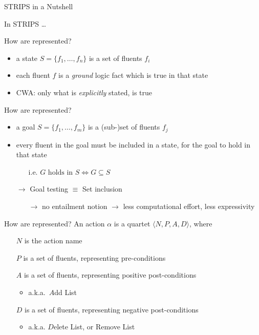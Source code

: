 \documentclass[presentation]{beamer}\mode<presentation>{\usetheme{AMSBolognaFC}}
\begin{document}
\begin{frame}[allowframebreaks]{STRIPS in a Nutshell}

In STRIPS \ldots

\begin{block}{How are  represented?}
    \begin{itemize}
        \item a state $S = \{ f_1, \ldots, f_n\}$ is a \alert{set} of \alert{fluents} $f_i$
        \item each fluent $f$ is a \emph{ground} logic \alert{fact} which is true in that state
        \item CWA: only what is \emph{explicitly} stated, is true
    \end{itemize}
\end{block}

\begin{block}{How are  represented?}
    \begin{itemize}
        \item a goal $S = \{ f_1, \ldots, f_m\}$ is a \alert{(sub-)set} of \alert{fluents} $f_j$
        \item every fluent in the goal must be \alert{included} in a state, for the goal to hold in that state
        \begin{itemize}
            \item[i.e.] $G \text{ holds in } S \Leftrightarrow G \subseteq S$
        \end{itemize}
        \item[$\rightarrow$] Goal testing $\equiv$ Set inclusion
        \begin{itemize}
            \item[$\rightarrow$] no entailment notion $\rightarrow$ less computational effort, less expressivity
        \end{itemize}
    \end{itemize}
\end{block}

\framebreak

\begin{block}{How are  represented?}
    An action $\alpha$ is a quartet $\langle N, P, A, D \rangle$, where
    \begin{itemize}
        \item[$N$] is the action name
        \item[$P$] is a set of fluents, representing \alert{pre}-conditions
        \item[$A$] is a set of fluents, representing \alert{positive post}-conditions
        \begin{itemize}
            \item a.k.a.\ $A$dd List
        \end{itemize}
        \item[$D$] is a set of fluents, representing \alert{negative post}-conditions
        \begin{itemize}
            \item a.k.a. $D$elete List, or Remove List
        \end{itemize}
    \end{itemize}
\end{block}


\end{frame}
\end{document}
